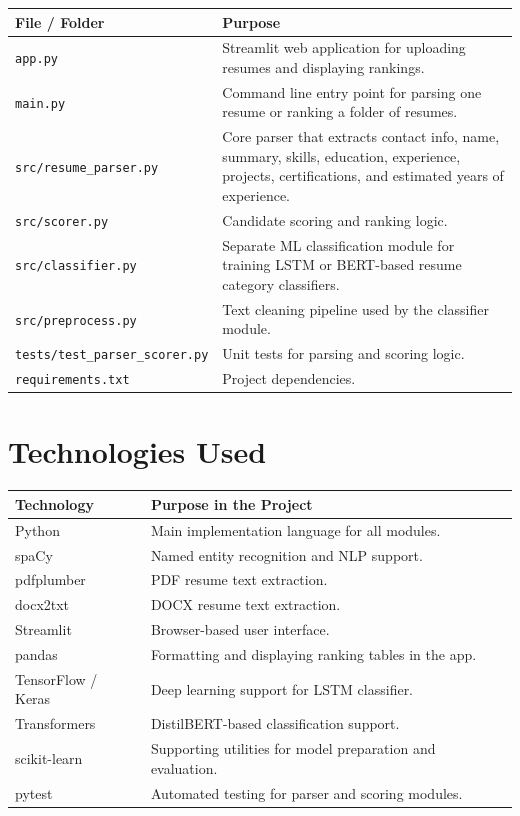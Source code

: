 \documentclass[12pt,a4paper]{article}
\begin{document}
\begin{longtable}{p{4cm}p{10cm}}
\toprule
\textbf{File / Folder} & \textbf{Purpose} \\
\midrule
\texttt{app.py} & Streamlit web application for uploading resumes and displaying rankings. \\
\texttt{main.py} & Command line entry point for parsing one resume or ranking a folder of resumes. \\
\texttt{src/resume\_parser.py} & Core parser that extracts contact info, name, summary, skills, education, experience, projects, certifications, and estimated years of experience. \\
\texttt{src/scorer.py} & Candidate scoring and ranking logic. \\
\texttt{src/classifier.py} & Separate ML classification module for training LSTM or BERT-based resume category classifiers. \\
\texttt{src/preprocess.py} & Text cleaning pipeline used by the classifier module. \\
\texttt{tests/test\_parser\_scorer.py} & Unit tests for parsing and scoring logic. \\
\texttt{requirements.txt} & Project dependencies. \\
\bottomrule
\end{longtable}

\section{Technologies Used}
\begin{longtable}{p{4cm}p{10cm}}
\toprule
\textbf{Technology} & \textbf{Purpose in the Project} \\
\midrule
Python & Main implementation language for all modules. \\
spaCy & Named entity recognition and NLP support. \\
pdfplumber & PDF resume text extraction. \\
docx2txt & DOCX resume text extraction. \\
Streamlit & Browser-based user interface. \\
pandas & Formatting and displaying ranking tables in the app. \\
TensorFlow / Keras & Deep learning support for LSTM classifier. \\
Transformers & DistilBERT-based classification support. \\
scikit-learn & Supporting utilities for model preparation and evaluation. \\
pytest & Automated testing for parser and scoring modules. \\
\bottomrule
\end{longtable}
\end{document}
